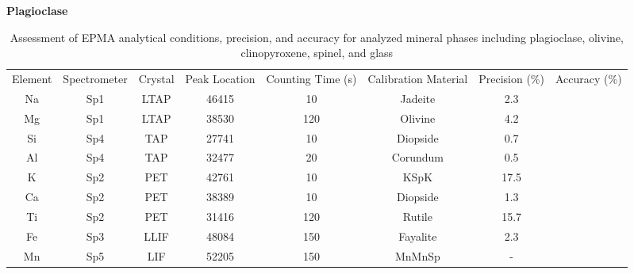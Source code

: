 \begin{table}[!htbp]
\caption[EPMA analytical conditions, precision, and accuracy]{Assessment of EPMA analytical conditions, precision, and accuracy for analyzed mineral phases including plagioclase, olivine, clinopyroxene, spinel, and glass}
\label{table:EPMAConditions}

\begin{subtable}[h]{1\textwidth}
\centering
\small \textbf{Plagioclase} \\ 
\small
\vspace{5pt}
\begin{adjustbox}{width=1\textwidth, center=\textwidth}
\begin{tabular}{c c c c c c c c}
\hline 
\multirow{3}{*}{Element} & \multirow{3}{*}{Spectrometer} & \multirow{3}{*}{Crystal} & \multirow{3}{*}{Peak Location} & \multirow{3}{2cm}{\centering Counting Time (s)}  & \multirow{3}{2cm}{\centering Calibration Material} & \multirow{3}{*}{Precision (\%)} & \multirow{3}{*}{Accuracy (\%)}\\ 
\\ 
\\
\hline
Na & Sp1 & LTAP & 46415 & 10 & Jadeite & 2.3 &  \\
Mg & Sp1 & LTAP & 38530 & 120 & Olivine & 4.2 &  \\
Si & Sp4 & TAP & 27741 & 10 & Diopside & 0.7 &  \\
Al & Sp4 & TAP & 32477 & 20 & Corundum & 0.5 &  \\
K & Sp2 & PET & 42761 & 10 & KSpK & 17.5 &  \\
Ca & Sp2 & PET & 38389 & 10 & Diopside & 1.3 &  \\
Ti & Sp2 & PET & 31416 &120 & Rutile & 15.7 &  \\
Fe & Sp3 & LLIF & 48084 & 150 & Fayalite & 2.3 &  \\
Mn & Sp5 & LIF & 52205 & 150 & MnMnSp & - &  \\
\hline 
\end{tabular}
\end{adjustbox}
\vspace{3pt} \\
\end{subtable}


\end{table}
